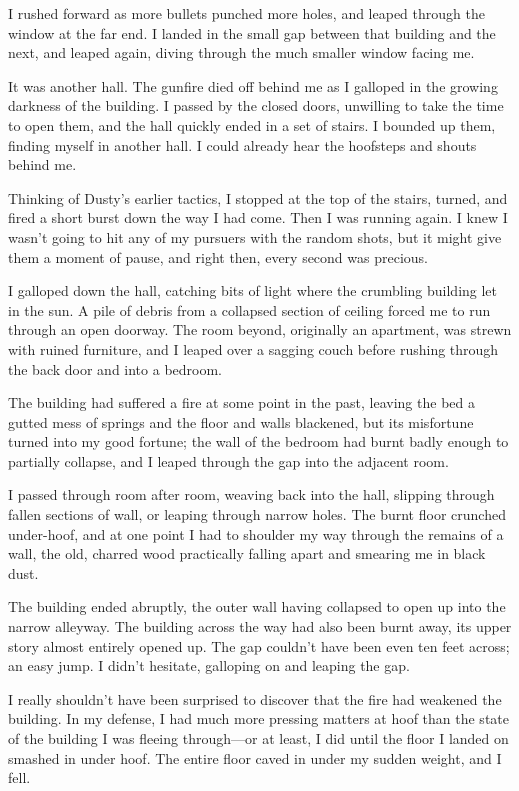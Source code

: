 I rushed forward as more bullets punched more holes, and leaped through the window at the far end. I landed in the small gap between that building and the next, and leaped again, diving through the much smaller window facing me.

It was another hall. The gunfire died off behind me as I galloped in the growing darkness of the building. I passed by the closed doors, unwilling to take the time to open them, and the hall quickly ended in a set of stairs. I bounded up them, finding myself in another hall. I could already hear the hoofsteps and shouts behind me.

Thinking of Dusty’s earlier tactics, I stopped at the top of the stairs, turned, and fired a short burst down the way I had come. Then I was running again. I knew I wasn’t going to hit any of my pursuers with the random shots, but it might give them a moment of pause, and right then, every second was precious.

I galloped down the hall, catching bits of light where the crumbling building let in the sun. A pile of debris from a collapsed section of ceiling forced me to run through an open doorway. The room beyond, originally an apartment, was strewn with ruined furniture, and I leaped over a sagging couch before rushing through the back door and into a bedroom.

The building had suffered a fire at some point in the past, leaving the bed a gutted mess of springs and the floor and walls blackened, but its misfortune turned into my good fortune; the wall of the bedroom had burnt badly enough to partially collapse, and I leaped through the gap into the adjacent room.

I passed through room after room, weaving back into the hall, slipping through fallen sections of wall, or leaping through narrow holes. The burnt floor crunched under-hoof, and at one point I had to shoulder my way through the remains of a wall, the old, charred wood practically falling apart and smearing me in black dust.

The building ended abruptly, the outer wall having collapsed to open up into the narrow alleyway. The building across the way had also been burnt away, its upper story almost entirely opened up. The gap couldn’t have been even ten feet across; an easy jump. I didn’t hesitate, galloping on and leaping the gap.

I really shouldn’t have been surprised to discover that the fire had weakened the building. In my defense, I had much more pressing matters at hoof than the state of the building I was fleeing through—or at least, I did until the floor I landed on smashed in under hoof. The entire floor caved in under my sudden weight, and I fell.


